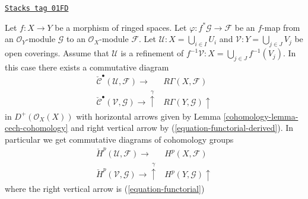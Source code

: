 \begin{lemma}
\label{cohomology-lemma-functoriality-cech}
\href{https://stacks.math.columbia.edu/tag/01FD}{\texttt{Stacks tag 01FD}}

Let $f : X \to Y$ be a morphism of ringed spaces.
Let $\varphi : f^*\mathcal{G} \to \mathcal{F}$ be an $f$-map
from an $\mathcal{O}_Y$-module $\mathcal{G}$ to an
$\mathcal{O}_X$-module $\mathcal{F}$.
Let $\mathcal{U} : X = \bigcup_{i \in I} U_i$ and
$\mathcal{V} : Y = \bigcup_{j \in J} V_j$ be open coverings.
Assume that $\mathcal{U}$ is a refinement of
$f^{-1}\mathcal{V} : X = \bigcup_{j \in J} f^{-1}(V_j)$.
In this case there exists a commutative diagram
$$
\begin{array}{cc}\check{\mathcal{C}}^\bullet(\mathcal{U}, \mathcal{F}) \longrightarrow & R\Gamma(X, \mathcal{F}) \\ \check{\mathcal{C}}^\bullet(\mathcal{V}, \mathcal{G}) \longrightarrow\overset{\gamma}{\uparrow} & R\Gamma(Y, \mathcal{G}) \uparrow\end{array}
$$
in $D^{+}(\mathcal{O}_X(X))$ with horizontal arrows given by
Lemma \ref{cohomology-lemma-cech-cohomology} and right vertical arrow by
(\ref{equation-functorial-derived}).
In particular we get commutative diagrams of cohomology groups
$$
\begin{array}{cc}\check{H}^p(\mathcal{U}, \mathcal{F}) \longrightarrow & H^p(X, \mathcal{F}) \\ \check{H}^p(\mathcal{V}, \mathcal{G}) \longrightarrow\overset{\gamma}{\uparrow} & H^p(Y, \mathcal{G}) \uparrow\end{array}
$$
where the right vertical arrow is (\ref{equation-functorial})
\end{lemma}

